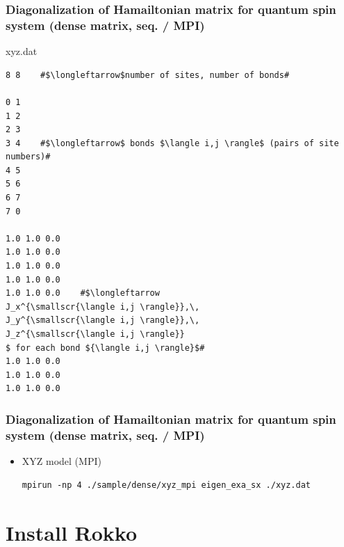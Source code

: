 \begin{frame}[c,fragile]
  \frametitle{Diagonalization of Hamailtonian matrix for quantum spin system (dense matrix, seq. / MPI)}
xyz.dat
\begin{lstlisting}[style=shstyle]
8 8    #$\longleftarrow$number of sites, number of bonds#

0 1
1 2
2 3
3 4    #$\longleftarrow$ bonds $\langle i,j \rangle$ (pairs of site numbers)#
4 5
5 6
6 7
7 0

1.0 1.0 0.0
1.0 1.0 0.0
1.0 1.0 0.0
1.0 1.0 0.0
1.0 1.0 0.0    #$\longleftarrow
J_x^{\smallscr{\langle i,j \rangle}},\, 
J_y^{\smallscr{\langle i,j \rangle}},\,
J_z^{\smallscr{\langle i,j \rangle}}
$ for each bond ${\langle i,j \rangle}$#
1.0 1.0 0.0
1.0 1.0 0.0
1.0 1.0 0.0
\end{lstlisting}
\end{frame}
  

\begin{frame}[c,fragile]
  \frametitle{Diagonalization of Hamailtonian matrix for quantum spin system (dense matrix, seq. / MPI)}
  \begin{itemize}
  \item XYZ model (MPI) 
\begin{lstlisting}[style=shstyle]
mpirun -np 4 ./sample/dense/xyz_mpi eigen_exa_sx ./xyz.dat
\end{lstlisting}
  \end{itemize}
\end{frame}



\section{Install Rokko}

